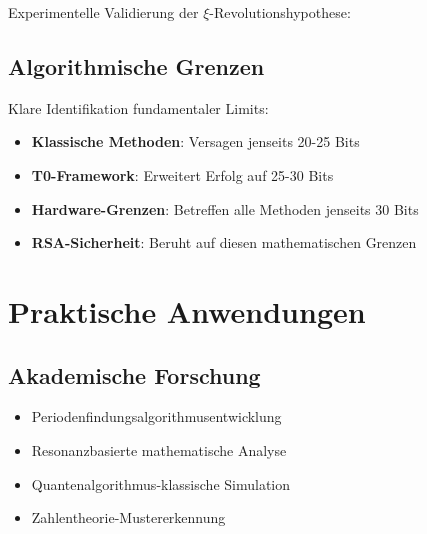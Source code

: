 	Experimentelle Validierung der $\xi$-Revolutionshypothese:
	
	\begin{table}[H]
		\centering
		\caption{$\xi$-Strategieeffektivität}
	\end{table}
	
	\subsection{Algorithmische Grenzen}
	
	Klare Identifikation fundamentaler Limits:
	\begin{itemize}
		\item \textbf{Klassische Methoden}: Versagen jenseits 20-25 Bits
		\item \textbf{T0-Framework}: Erweitert Erfolg auf 25-30 Bits
		\item \textbf{Hardware-Grenzen}: Betreffen alle Methoden jenseits 30 Bits
		\item \textbf{RSA-Sicherheit}: Beruht auf diesen mathematischen Grenzen
	\end{itemize}
	
	\section{Praktische Anwendungen}
	
	\subsection{Akademische Forschung}
	\begin{itemize}
		\item Periodenfindungsalgorithmusentwicklung
		\item Resonanzbasierte mathematische Analyse
		\item Quantenalgorithmus-klassische Simulation
		\item Zahlentheorie-Mustererkennung
	\end{itemize}
	
